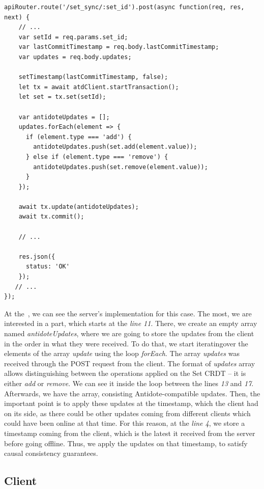 \begin{lstlisting}[caption={Code for applying an \textit{add} operation to a Set CRDT.}, label={lst:dev3}]
apiRouter.route('/set_sync/:set_id').post(async function(req, res, next) {
    // ...
    var setId = req.params.set_id;
    var lastCommitTimestamp = req.body.lastCommitTimestamp;
    var updates = req.body.updates;

    setTimestamp(lastCommitTimestamp, false);
    let tx = await atdClient.startTransaction();
    let set = tx.set(setId);

    var antidoteUpdates = [];
    updates.forEach(element => {
      if (element.type === 'add') {
        antidoteUpdates.push(set.add(element.value));
      } else if (element.type === 'remove') {
        antidoteUpdates.push(set.remove(element.value));
      }
    });

    await tx.update(antidoteUpdates);
    await tx.commit();
    
    // ...

    res.json({
      status: 'OK'
    });
   // ...
});
\end{lstlisting}

At the~, we can see the server's implementation for this case. The most, we are interested in a part, which starts at the \textit{line 11}. There, we create an empty array named \textit{antidoteUpdates}, where we are going to store the updates from the client in the order in what they were received. To do that, we start iteratingover the elements of the array \textit{update} using the loop \textit{forEach}. The array \textit{updates} was received through the POST request from the client. The format of \textit{updates} array allows distinguishing between the operations applied on the Set CRDT -- it is either \textit{add} or \textit{remove}. We can see it inside the loop between the lines \textit{13} and \textit{17}. Afterwards, we have the array, consisting Antidote-compatible updates. Then, the important point is to apply these updates at the timestamp, which the client had on its side, as there could be other updates coming from different clients which could have been online at that time. For this reason, at the \textit{line 4}, we store a timestamp coming from the client, which is the latest it received from the server before going offline. Thus, we apply the updates on that timestamp, to satisfy causal consistency guarantees.

\subsection{Client}

